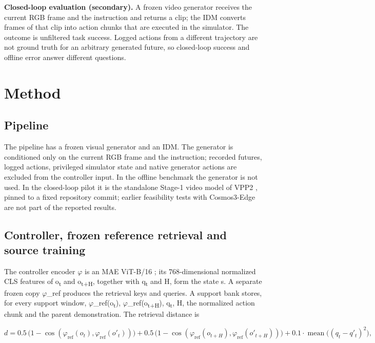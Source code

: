 \documentclass[11pt,a4paper]{article}
\begin{document}
\textbf{Closed-loop evaluation (secondary).} A frozen video generator receives the current RGB frame and the instruction and returns a clip; the IDM converts frames of that clip into action chunks that are executed in the simulator. The outcome is unfiltered task success. Logged actions from a different trajectory are not ground truth for an arbitrary generated future, so closed-loop success and offline error answer different questions.

\section{Method}

\subsection{Pipeline}

The pipeline has a frozen visual generator and an IDM. The generator is conditioned only on the current RGB frame and the instruction; recorded futures, logged actions, privileged simulator state and native generator actions are excluded from the controller input. In the offline benchmark the generator is not used. In the closed-loop pilot it is the standalone Stage-1 video model of VPP2 \cite{ref5}, pinned to a fixed repository commit; earlier feasibility tests with Cosmos3-Edge \cite{ref44} are not part of the reported results.

\subsection{Controller, frozen reference retrieval and source training}

The controller encoder \ensuremath{\varphi} is an MAE ViT-B/16 \cite{ref39}; its 768-dimensional normalized CLS features of o\textsubscript{t} and o\textsubscript{t+H}, together with q\textsubscript{t} and H, form the state s. A separate frozen copy \ensuremath{\varphi}\_ref produces the retrieval keys and queries. A support bank stores, for every support window, \ensuremath{\varphi}\_ref(o\textsubscript{t}), \ensuremath{\varphi}\_ref(o\textsubscript{t+H}), q\textsubscript{t}, H, the normalized action chunk and the parent demonstration. The retrieval distance is

\[
d = 0.5\,\bigl(1-\cos(\varphi_{\mathrm{ref}}(o_t),\varphi_{\mathrm{ref}}(o'_t))\bigr)
  + 0.5\,\bigl(1-\cos(\varphi_{\mathrm{ref}}(o_{t+H}),\varphi_{\mathrm{ref}}(o'_{t+H}))\bigr)
  + 0.1\cdot\operatorname{mean}\bigl((q_t-q'_t)^2\bigr),
\]
\end{document}
